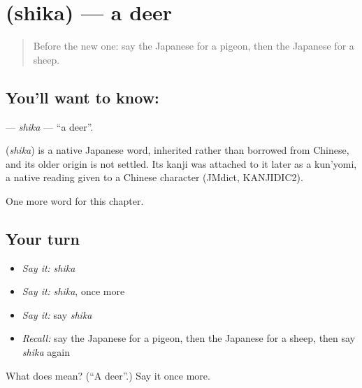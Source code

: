 \section[\texorpdfstring{\ja{しか} (shika)}{しか (shika)}]{ (shika) — a deer}

\label{lesson:JA-C46-shika}



\begin{quote}
Before the new one: say the Japanese for a pigeon, then the Japanese for a sheep.
\end{quote}

\subsection*{You'll want to know: }
\textbf{} — \emph{shika} — \textquotedblleft{}a deer\textquotedblright{}.

\begin{cousinweb}
\textbf{} (\emph{shika}) is a native Japanese word, inherited rather than borrowed from Chinese, and its older origin is not settled. Its kanji was attached to it later as a kun'yomi, a native reading given to a Chinese character (JMdict, KANJIDIC2).
\end{cousinweb}

\begin{grammarlens}[title={What you've built}]
One more word for this chapter.
\end{grammarlens}

\subsection*{Your turn}
\begin{itemize}
\raggedright
  \item \emph{Say it:} \emph{shika}
  \item \emph{Say it:} \emph{shika}, once more
  \item \emph{Say it:} say \emph{shika}
  \item \emph{Recall:} say the Japanese for a pigeon, then the Japanese for a sheep, then say \emph{shika} again
\end{itemize}

\begin{tcolorbox}[breakable,colback=teal!4,colframe=teal!35!black,title={Before you move on}]
What does  mean? (\textquotedblleft{}A deer\textquotedblright{}.) Say it once more.
\end{tcolorbox}
